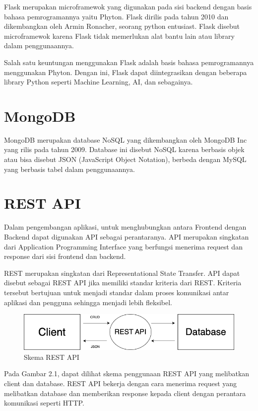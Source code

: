 Flask merupakan microframewok yang digunakan pada sisi backend dengan basis bahasa pemrogramannya yaitu Phyton. Flask dirilis pada tahun 2010 dan dikembangkan oleh Armin Ronacher, seorang python entusiast. Flask disebut microframewok karena Flask tidak memerlukan alat bantu lain atau library dalam penggunaannya.

Salah satu keuntungan menggunakan Flask adalah basis bahasa pemrogramannya menggunakan Phyton. Dengan ini, Flask dapat diintegrasikan dengan beberapa library Python seperti Machine Learning, AI, dan sebagainya.

\section{MongoDB}

MongoDB merupakan database NoSQL yang dikembangkan oleh MongoDB Inc yang rilis pada tahun 2009. Database ini disebut NoSQL karena berbasis objek atau bisa disebut JSON (JavaScript Object Notation), berbeda dengan MySQL yang berbasis tabel dalam penggunaannya.

\section{REST API}

Dalam pengembangan aplikasi, untuk menghubungkan antara Frontend dengan Backend dapat digunakan API sebagai perantaranya. API merupakan singkatan dari Application Programming Interface yang berfungsi menerima request dan response dari sisi frontend dan backend.

REST merupakan singkatan dari Representational State Transfer. API dapat disebut sebagai REST API jika memiliki standar kriteria dari REST. Kriteria tersebut bertujuan untuk menjadi standar dalam proses komunikasi antar aplikasi dan pengguna sehingga menjadi lebih fleksibel.

\begin{figure}[H]
	\centering
	\includegraphics[width=1\textwidth]{gambar/restapi.png}
	\caption{Skema REST API}
\end{figure}

Pada Gambar 2.1, dapat dilihat skema penggunaan REST API yang melibatkan client dan database. REST API bekerja dengan cara menerima request yang melibatkan database dan memberikan response kepada client dengan perantara komunikasi seperti HTTP.

